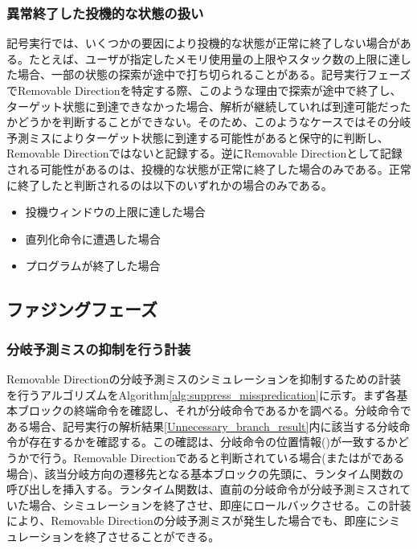 \subsubsection{異常終了した投機的な状態の扱い}
記号実行では、いくつかの要因により投機的な状態が正常に終了しない場合がある。たとえば、ユーザが指定したメモリ使用量の上限やスタック数の上限に達した場合、一部の状態の探索が途中で打ち切られることがある。記号実行フェーズでRemovable Directionを特定する際、このような理由で探索が途中で終了し、ターゲット状態に到達できなかった場合、解析が継続していれば到達可能だったかどうかを判断することができない。そのため、このようなケースではその分岐予測ミスによりターゲット状態に到達する可能性があると保守的に判断し、Removable Directionではないと記録する。逆にRemovable Directionとして記録される可能性があるのは、投機的な状態が正常に終了した場合のみである。正常に終了したと判断されるのは以下のいずれかの場合のみである。\par

\begin{itemize}
  \item 投機ウィンドウの上限に達した場合
  \item 直列化命令に遭遇した場合
  \item プログラムが終了した場合
\end{itemize}

\subsection{ファジングフェーズ}
\subsubsection{分岐予測ミスの抑制を行う計装}
Removable Directionの分岐予測ミスのシミュレーションを抑制するための計装を行うアルゴリズムをAlgorithm\ref{alg:suppress_misspredication}に示す。まず各基本ブロックの終端命令を確認し、それが分岐命令であるかを調べる。分岐命令である場合、記号実行の解析結果\ref{Unnecessary_branch_result}内に該当する分岐命令が存在するかを確認する。この確認は、分岐命令の位置情報()が一致するかどうかで行う。Removable Directionであると判断されている場合(またはがである場合)、該当分岐方向の遷移先となる基本ブロックの先頭に、ランタイム関数の呼び出しを挿入する。ランタイム関数は、直前の分岐命令が分岐予測ミスされていた場合、シミュレーションを終了させ、即座にロールバックさせる。この計装により、Removable Directionの分岐予測ミスが発生した場合でも、即座にシミュレーションを終了させることができる。\par

